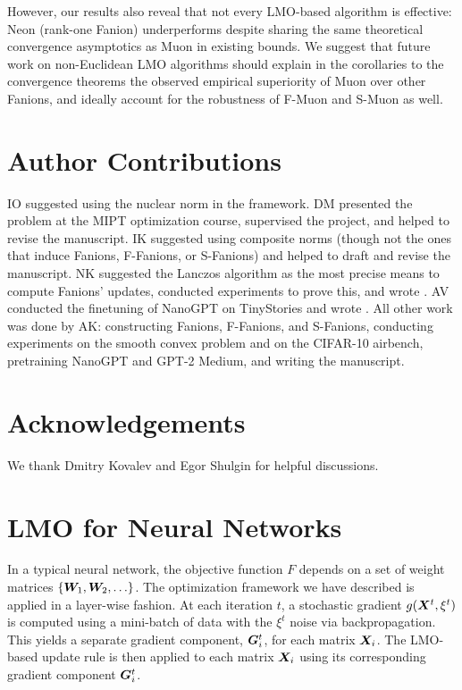 \documentclass[pmlr]{jmlr}%
\begin{document}
 However, our results also reveal that not every LMO-based algorithm is effective: Neon (rank-one Fanion) underperforms despite sharing the same theoretical convergence asymptotics as Muon in existing bounds. We suggest that future work on non-Euclidean LMO algorithms should explain in the corollaries to the convergence theorems the observed empirical superiority of Muon over other Fanions, and ideally account for the robustness of F-Muon and S-Muon as well.
 
 \section*{Author Contributions}
 
 IO suggested using the nuclear norm in the \citep{bernstein2024oldoptimizernewnorm} framework. DM presented the problem at the MIPT optimization course, supervised the project, and helped to revise the manuscript. IK suggested using composite norms (though not the ones that induce Fanions, F-Fanions, or S-Fanions) and helped to draft and revise the manuscript. NK suggested the Lanczos algorithm as the most precise means to compute Fanions' updates, conducted experiments to prove this, and wrote . AV conducted the finetuning of NanoGPT on TinyStories and wrote . All other work was done by AK: constructing Fanions, F-Fanions, and S-Fanions, conducting experiments on the smooth convex problem and on the CIFAR-10 airbench, pretraining NanoGPT and GPT-2 Medium, and writing the manuscript.
 
 \section*{Acknowledgements}
 We thank Dmitry Kovalev and Egor Shulgin for helpful discussions.
 
 
 
 \appendix
 \section{LMO for Neural Networks}\label{sec:lmo_for_nn}
 
 In a typical neural network, the objective function $F$ depends on a set of weight matrices $\{ {\bm{W}}_1, {\bm{W}}_2, \ldots \}$. The optimization framework we have described is applied in a layer-wise fashion. At each iteration $t$, a stochastic gradient $g({\bm{X}}^t, \xi^t)$ is computed using a mini-batch of data with the $\xi^t$ noise via backpropagation. This yields a separate gradient component, ${\bm{G}}_i^t$, for each matrix ${\bm{X}}_i$. The LMO-based update rule is then applied to each matrix ${\bm{X}}_i$ using its corresponding gradient component ${\bm{G}}_i^t$.
 
\end{document}
